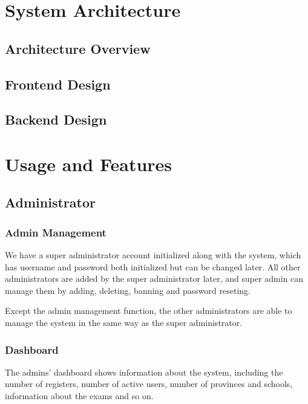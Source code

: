 \documentclass[12pt]{article}
\begin{document}
\section{System Architecture}
\subsection{Architecture Overview}
\subsection{Frontend Design}
\subsection{Backend Design}

\section{Usage and Features}
\subsection{Administrator}
\subsubsection{Admin Management}
We have a super administrator account initialized along with the system, which has username and password both initialized but can be changed later. All other administrators are added by
the super administrator later, and super admin can manage them by adding, deleting, banning and password reseting.

Except the admin management
function, the other administrators are able to manage the system in the same way as the super administrator.
\subsubsection{Dashboard}
The admins' dashboard shows information about the system, including the number of registers, number of active users, number of provinces and schools,
information about the exams and so on.
\end{document}
